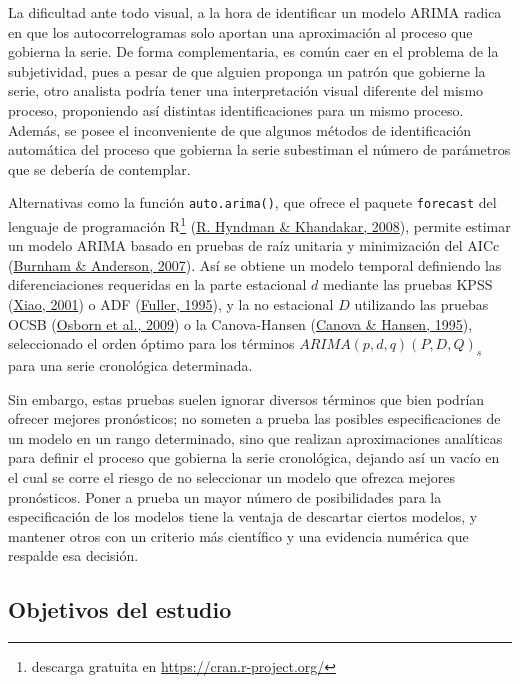 \documentclass[
]{article}
\begin{document}
La dificultad ante todo visual, a la hora de identificar un modelo ARIMA
radica en que los autocorrelogramas solo aportan una aproximación al
proceso que gobierna la serie. De forma complementaria, es común caer en
el problema de la subjetividad, pues a pesar de que alguien proponga un
patrón que gobierne la serie, otro analista podría tener una
interpretación visual diferente del mismo proceso, proponiendo así
distintas identificaciones para un mismo proceso. Además, se posee el
inconveniente de que algunos métodos de identificación automática del
proceso que gobierna la serie subestiman el número de parámetros que se
debería de contemplar.

Alternativas como la función \texttt{auto.arima()}, que ofrece el
paquete \texttt{forecast} del lenguaje de programación R\footnote{descarga
  gratuita en \url{https://cran.r-project.org/}}
(\protect\hyperlink{ref-auto.arima}{R. Hyndman \& Khandakar, 2008}),
permite estimar un modelo ARIMA basado en pruebas de raíz unitaria y
minimización del AICc (\protect\hyperlink{ref-burnham2007model}{Burnham
\& Anderson, 2007}). Así se obtiene un modelo temporal definiendo las
diferenciaciones requeridas en la parte estacional \(d\) mediante las
pruebas KPSS
(\protect\hyperlink{ref-doi:10.1111ux2f1467-9892.00213}{Xiao, 2001}) o
ADF (\protect\hyperlink{ref-fuller1995introduction}{Fuller, 1995}), y la
no estacional \(D\) utilizando las pruebas OCSB
(\protect\hyperlink{ref-Osborn2009SEASONALITYAT}{Osborn et al., 2009}) o
la Canova-Hansen (\protect\hyperlink{ref-10.2307ux2f1392184}{Canova \&
Hansen, 1995}), seleccionado el orden óptimo para los términos
\(ARIMA(p, d, q)(P, D, Q)_s\) para una serie cronológica determinada.

Sin embargo, estas pruebas suelen ignorar diversos términos que bien
podrían ofrecer mejores pronósticos; no someten a prueba las posibles
especificaciones de un modelo en un rango determinado, sino que realizan
aproximaciones analíticas para definir el proceso que gobierna la serie
cronológica, dejando así un vacío en el cual se corre el riesgo de no
seleccionar un modelo que ofrezca mejores pronósticos. Poner a prueba un
mayor número de posibilidades para la especificación de los modelos
tiene la ventaja de descartar ciertos modelos, y mantener otros con un
criterio más científico y una evidencia numérica que respalde esa
decisión.

\subsection{Objetivos del estudio}
\end{document}
